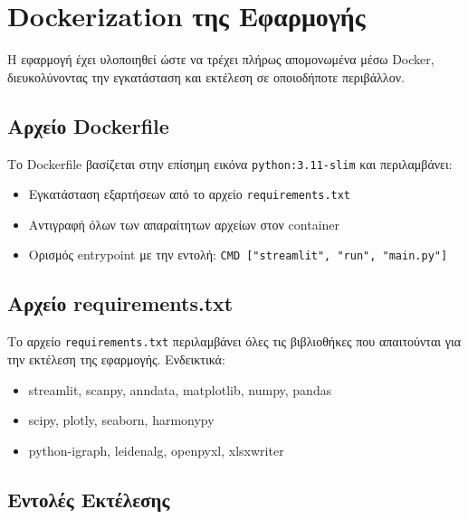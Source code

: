 \chapter{\foreignlanguage{english}{Dockerization} της Εφαρμογής}

Η εφαρμογή έχει υλοποιηθεί ώστε να τρέχει πλήρως απομονωμένα μέσω \foreignlanguage{english}{Docker}, διευκολύνοντας την εγκατάσταση και εκτέλεση σε οποιοδήποτε περιβάλλον.

\section*{Αρχείο \foreignlanguage{english}{Dockerfile}}

Το \foreignlanguage{english}{Dockerfile} βασίζεται στην επίσημη εικόνα \foreignlanguage{english}{\texttt{python:3.11-slim}} και περιλαμβάνει:

\begin{itemize}
  \item Εγκατάσταση εξαρτήσεων από το αρχείο \foreignlanguage{english}{\texttt{requirements.txt}}
  \item Αντιγραφή όλων των απαραίτητων αρχείων στον \foreignlanguage{english}{container}
  \item Ορισμός \foreignlanguage{english}{entrypoint} με την εντολή: \foreignlanguage{english}{\texttt{CMD ["streamlit", "run", "main.py"]}}
\end{itemize}

\section*{Αρχείο \foreignlanguage{english}{requirements.txt}}

Το αρχείο \foreignlanguage{english}{\texttt{requirements.txt}} περιλαμβάνει όλες τις βιβλιοθήκες που απαιτούνται για την εκτέλεση της εφαρμογής. Ενδεικτικά:

\begin{itemize}
  \item \foreignlanguage{english}{streamlit, scanpy, anndata, matplotlib, numpy, pandas}
  \item \foreignlanguage{english}{scipy, plotly, seaborn, harmonypy}
  \item \foreignlanguage{english}{python-igraph, leidenalg, openpyxl, xlsxwriter}
\end{itemize}

\newpage

\section*{Εντολές Εκτέλεσης}

